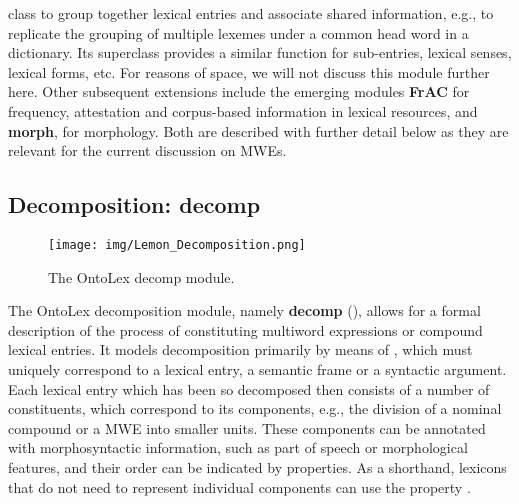 \documentclass[output=paper,colorlinks,citecolor=brown]{langscibook}
\begin{document}
class  to group together lexical entries and associate shared information, e.g., to replicate the grouping of multiple lexemes under a common head word in a dictionary. Its superclass  provides a similar function for sub-entries, lexical senses, lexical forms, etc. For reasons of space, we will not discuss this module further here.
Other subsequent extensions include the emerging modules \textbf{FrAC} for frequency, attestation and corpus-based information in lexical resources, and \textbf{morph}, for morphology. Both are described with further detail below as they are relevant for the current discussion on MWEs.

\subsection{Decomposition: decomp} %
\label{section:ontolex-decomp}

\begin{figure}
\texttt{[image: img/Lemon\_Decomposition.png]}
\caption{The OntoLex decomp module.}
\label{fig-decomp}
\end{figure}

\begin{sloppypar}
The OntoLex decomposition module, namely \textbf{decomp} (), allows for a formal description of the process of constituting multiword expressions or compound lexical entries. %
It models decomposition primarily by means of ,
which must uni\-que\-ly correspond to a lexical entry,
a semantic frame or a syntactic argument.
Each lexical entry which has been so decomposed then consists of a number of constituents, which correspond to its components, e.g.,
the division of a nominal compound or a MWE into smaller units.
These components can be annotated with morphosyntactic information, such as part of speech or morphological features, and their order can be indicated
by  properties.
As a shorthand, lexicons that do not need to represent individual components can use the property .
\end{sloppypar}
\end{document}

